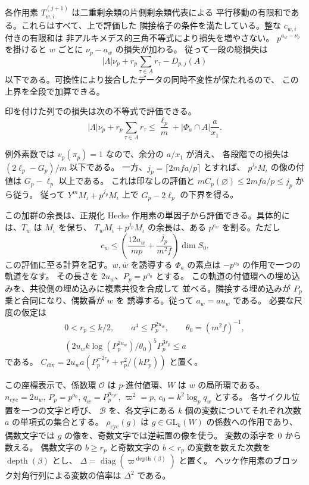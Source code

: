 各作用素 \(T_{w,i}^{(j+1)}\) は二重剰余類の片側剰余類代表による
平行移動の有限和である。これらはすべて、上で評価した
隣接格子の条件を満たしている。整な \(c_{w,i}\) 付きの有限和は
非アルキメデス的三角不等式により損失を増やさない。
\(p^{a_w-\nu_p}\) を掛けると \(w\) ごとに \(\nu_p-a_w\) の損失が加わる。
従って一段の総損失は
\[
  |\Lambda|\nu_p+r_p\sum_{\tau\in A}r_\tau-D_{p,j}(A)
\]
以下である。可換性により接合したデータの同時不変性が保たれるので、
この上界を全段で加算できる。

印を付けた列での損失は次の不等式で評価できる。
\[
 |\Lambda|\nu_p+r_p\sum_{\tau\in A}r_\tau
 \le \frac{\ell_p}{m}+|\Phi_a\cap A|\frac a{x_1}.
\]

例外素数では \(v_p(\pi_p)=1\) なので、余分の \(a/x_1\) が消え、
各段階での損失は \((2\ell_p-G_p)/m\) 以下である。
一方、\(j_p=\lceil 2mfa/p\rceil\) とすれば、
\(p^{j_p}M_\iota\) の像の付値は \(G_p-\ell_p\) 以上である。
これは印なしの評価と \(mC_p(\varnothing)\le 2mfa/p\le j_p\) から従う。
従って \(Y^m M_\iota+p^{j_p}M_\iota\) 上で
\(G_p-2\ell_p\) の下界を得る。

この加群の余長は、正規化 Hecke 作用素の単因子から評価できる。具体的には、\(T_w\) は \(M_\iota\) を保ち、
\(T_wM_\iota+p^{j_p}M_\iota\) の余長は、ある \(p^{c_w}\) を割る。ただし
\[
  c_w\le\left(\frac{12a_w}{mp}+\frac{j_p}{m^2f}\right)\dim S_0 .
\]
この評価に至る計算を記す。\(w,\overline w\) を誘導する \(\Phi_a\)
の素点は \(-p^{o_0}\) の作用で一つの軌道をなす。
その長さを \(2u_w\)、\(P_p=p^{o_0}\) とする。
この軌道の付値環への埋め込みを、共役側の埋め込みに複素共役を合成して
並べる。隣接する埋め込みが \(P_p\) 乗と合同になり、偶数番が \(w\) を
誘導する。従って \(a_w=au_w\) である。
必要な尺度の仮定は
\[
 \begin{gathered}
  0<r_p\le k/2,\qquad a^4\le P_p^{2u_w},\qquad \theta_0=(m^2f)^{-1},\\
  (2u_w k\log(P_p^{2u_w})/\theta_0)^5 P_p^{3r_p}\le a
 \end{gathered}
\]
である。
\(C_{\mathrm{div}}=2u_wa(P_p^{-2r_p}+r_p^2/(kP_p))\) と置く。

この座標表示で、係数環 \(\mathcal O\) は \(p\)-進付値環、\(W\) は \(w\) の局所環である。
\(n_\mathrm{cyc}=2u_w\), \(P_p=p^{o_0}\), \(q_w=P_p^{n_\mathrm{cyc}}\),
\(\varpi^2=p\), \(c_0=k^2\log_p q_w\) とする。
各サイクル位置を一つの文字と呼び、
\(\mathcal B\) を、各文字にある \(k\) 個の変数についてそれぞれ次数 \(a\) の単項式の集合とする。
\(\rho_\mathrm{cyc}(g)\) は \(g\in\mathrm{GL}_k(W)\) の係数への作用であり、
偶数文字では \(g\) の像を、奇数文字では逆転置の像を使う。
変数の添字を \(0\) から数える。
偶数文字の \(b\ge r_p\) と奇数文字の \(b<r_p\) の変数を数えた次数を
\(\operatorname{depth}(\beta)\) とし、
\(\Delta=\operatorname{diag}(\varpi^{\operatorname{depth}(\beta)})\) と置く。
ヘッケ作用素のブロック対角行列による変数の倍率は \(\Delta^2\) である。

